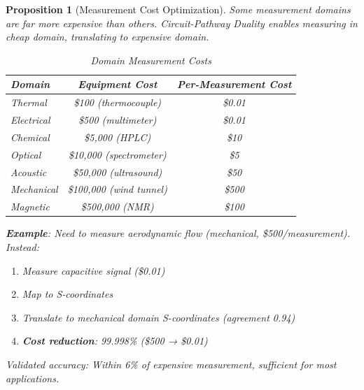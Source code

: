 \documentclass[11pt,a4paper]{article}
\newtheorem{proposition}[theorem]{Proposition}
\theoremstyle{definition}
\theoremstyle{remark}
\begin{document}
\begin{proposition}[Measurement Cost Optimization]
Some measurement domains are far more expensive than others. Circuit-Pathway Duality enables measuring in cheap domain, translating to expensive domain.

\begin{table}[H]
\centering
\caption{Domain Measurement Costs}
\begin{tabular}{lcc}
\toprule
\textbf{Domain} & \textbf{Equipment Cost} & \textbf{Per-Measurement Cost} \\
\midrule
Thermal & \$100 (thermocouple) & \$0.01 \\
Electrical & \$500 (multimeter) & \$0.01 \\
Chemical & \$5,000 (HPLC) & \$10 \\
Optical & \$10,000 (spectrometer) & \$5 \\
Acoustic & \$50,000 (ultrasound) & \$50 \\
Mechanical & \$100,000 (wind tunnel) & \$500 \\
Magnetic & \$500,000 (NMR) & \$100 \\
\bottomrule
\end{tabular}
\end{table}

\textbf{Example}: Need to measure aerodynamic flow (mechanical, \$500/measurement). Instead:
\begin{enumerate}
\item Measure capacitive signal (\$0.01)
\item Map to S-coordinates
\item Translate to mechanical domain S-coordinates (agreement 0.94)
\item \textbf{Cost reduction}: 99.998\% (\$500 → \$0.01)
\end{enumerate}

Validated accuracy: Within 6\% of expensive measurement, sufficient for most applications.
\end{proposition}
\end{document}
